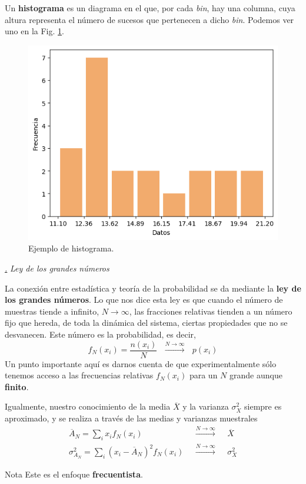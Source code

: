 \documentclass[a4paper,11pt]{book} %
\numberwithin{equation}{chapter}
\def\subsubiContadorIt{\par\addtocounter{subsubsection}{1}\underline{\it\thesubsubsection.}\hskip0.5cm \setcounter{subsubsubsectionIt}{0}}
\newcommand{\SubsubiIt}[1]{
		\subsubiContadorIt \textit{#1}
	}
\newcounter{subsubsubsectionIt}[subsubsection]
\begin{document}
Un \textbf{histograma} es un diagrama en el que, por cada \textit{bin}, hay una columna, cuya altura representa el número de sucesos que pertenecen a dicho \textit{bin}. Podemos ver uno en la Fig. \ref{Fig_formalismo_histograma}. 

	\begin{figure}[t]
	\centering 
	\includegraphics[width=0.4\linewidth]{Figuras/Fig_formalismo_histograma.png}
	\caption{Ejemplo de histograma.}
	\label{Fig_formalismo_histograma}
	\end{figure}

			\SubsubiIt{Ley de los grandes números}

La conexión entre estadística y teoría de la probabilidad se da mediante la \textbf{ley de los grandes números}. Lo que nos dice esta ley es que cuando el número de muestras tiende a infinito, $N\to \infty$, las fracciones relativas tienden a un número fijo que hereda, de toda la dinámica del sistema, ciertas propiedades que no se desvanecen. Este número es la probabilidad, es decir, 
	\begin{equation}
	f_N(x_i) = \frac{n(x_i)}{N}~~~\stackrel{N\to\infty}{\longrightarrow}~~~{p(x_i)}
	\end{equation}
Un punto importante aquí es darnos cuenta de que experimentalmente sólo tenemos acceso a las frecuencias relativas $f_N(x_i)$ para un $N$ grande aunque \textbf{finito}.

Igualmente, nuestro conocimiento de la  media $\overline X$  y la varianza $\sigma_X^2$ siempre es aproximado, y se realiza a través de las medias y varianzas muestrales
\begin{eqnarray}
\overline{A}_N = \sum_i x_i f_N(x_i)~~~&\stackrel{N\to\infty}{\longrightarrow}&~~~ \overline{X}\\
\sigma_{A_N}^2 = \sum_{i} (x_i - \overline{A}_N)^2 f_N(x_i) ~~~&\stackrel{N\to\infty}{\longrightarrow}&~~~ \sigma_X^2
\end{eqnarray}

\begin{mybox_blue}{Nota}
Este es el enfoque \textbf{frecuentista}.
\end{mybox_blue}
\end{document}
